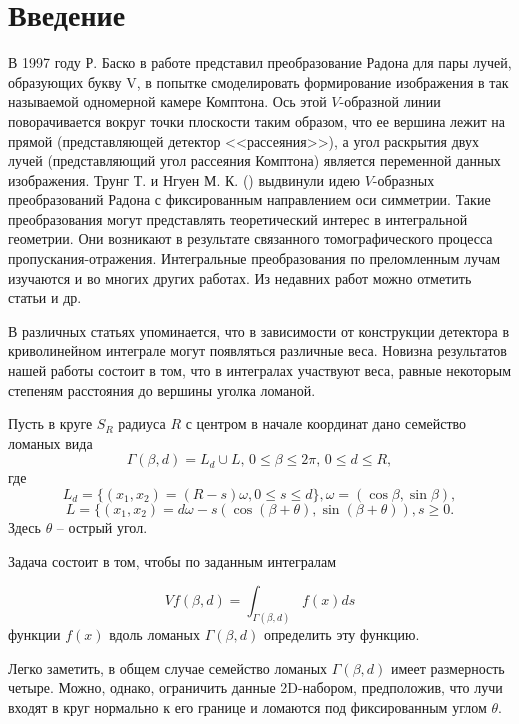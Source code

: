 \chapter{Введение}\label{MZG}

В 1997 году Р. Баско в работе \cite{mzg-Basko} представил преобразование Радона для пары лучей, образующих букву V, в попытке смоделировать формирование изображения в так называемой одномерной камере Комптона. Ось этой $V$-образной линии поворачивается вокруг точки плоскости таким образом, что ее вершина лежит на прямой (представляющей детектор <<рассеяния>>), а угол раскрытия двух лучей (представляющий угол рассеяния Комптона) является переменной данных изображения.
Трунг Т. и Нгуен М. К. (\cite{mzg-Truong}) выдвинули идею $V$-образных преобразований Радона с фиксированным направлением оси симметрии. Такие преобразования могут представлять теоретический интерес в интегральной геометрии. Они возникают в результате связанного томографического процесса пропускания-отражения. Интегральные преобразования по преломленным лучам изучаются и во многих других работах. Из недавних работ можно отметить статьи \cite{mzg-Ambartsoumian2,mzg-Kuchment} и др.

В различных статьях упоминается, что в зависимости от конструкции детектора в криволинейном интеграле могут появляться различные веса. Новизна результатов нашей работы состоит в том, что в интегралах участвуют веса, равные некоторым степеням расстояния до вершины уголка ломаной.

Пусть в круге $S_R$ радиуса $R$ с центром в начале координат дано семейство ломаных вида
$$\Gamma(\beta,d)=L_d\cup L, \, 0\leq\beta\leq 2\pi, \, 0\leq d\leq R,$$
где
$$L_d=\{(x_1, x_2)=(R-s)\omega,  0\leq s\leq d\}, \omega=(\cos\beta, \sin \beta),$$
$$L=\{(x_1, x_2)=d\omega-s(\cos (\beta+\theta), \sin (\beta+\theta)), s\geq 0.$$
Здесь $\theta$ -- острый угол.

Задача состоит в том, чтобы по заданным интегралам

\begin{equation}
\label{mzg-eq-one3}
Vf(\beta,d)=\int_{\Gamma(\beta,d)}f(x)ds
\end{equation}
функции $f(x)$ вдоль ломаных $\Gamma(\beta,d)$ определить эту функцию.

Легко заметить, в общем случае семейство ломаных $\Gamma(\beta,d)$ имеет размерность четыре. Можно, однако, ограничить данные 2D-набором, предположив, что лучи входят в круг нормально к его границе и ломаются под фиксированным углом $\theta$.

